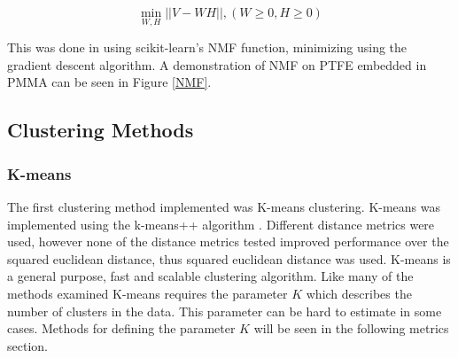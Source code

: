 \documentclass[a4paper,11pt]{article}
\begin{document}
\begin{equation}
\min_{W,H} || V - WH ||, ( W \geq 0, H \geq 0 )
\end{equation}

This was done in using scikit-learn's NMF function, minimizing using the gradient descent algorithm. A demonstration of NMF on PTFE embedded in PMMA can be seen in Figure \ref{NMF}.

\subsection{Clustering Methods}

\subsubsection{K-means}

The first clustering method implemented was K-means clustering. K-means was implemented using the k-means++ algorithm \cite{ArthurK-means++:Seeding}. Different distance metrics were used, however none of the distance metrics tested improved performance over the squared euclidean distance, thus squared euclidean distance was used. K-means is a general purpose, fast and scalable clustering algorithm. Like many of the methods examined K-means requires the parameter $K$ which describes the number of clusters in the data. This parameter can be hard to estimate in some cases. Methods for defining the parameter $K$ will be seen in the following metrics section.
\end{document}
